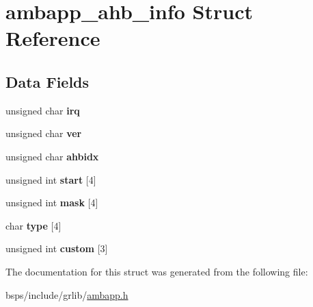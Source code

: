 \hypertarget{structambapp__ahb__info}{}\section{ambapp\+\_\+ahb\+\_\+info Struct Reference}
\label{structambapp__ahb__info}
\subsection*{Data Fields}
\begin{DoxyCompactItemize}
\item 
\mbox{\label{structambapp__ahb__info_abf266deb9afb823e7ff34196570d9f3a}} 
unsigned char {\bfseries irq}
\item 
\mbox{\label{structambapp__ahb__info_ad67939208d2d2c630d3cd3a42517eae7}} 
unsigned char {\bfseries ver}
\item 
\mbox{\label{structambapp__ahb__info_a5165ae0d93924d063e04b126a389d4c9}} 
unsigned char {\bfseries ahbidx}
\item 
\mbox{\label{structambapp__ahb__info_ac352377d1d5965f771eb467077794cd4}} 
unsigned int {\bfseries start} \mbox{[}4\mbox{]}
\item 
\mbox{\label{structambapp__ahb__info_a36b4fb4a620f6156bbba72de622436bb}} 
unsigned int {\bfseries mask} \mbox{[}4\mbox{]}
\item 
\mbox{\label{structambapp__ahb__info_a5085915978cd0f632f8ac1e2f4830442}} 
char {\bfseries type} \mbox{[}4\mbox{]}
\item 
\mbox{\label{structambapp__ahb__info_a2b221f82f5723b985b13bca7c6e20a3d}} 
unsigned int {\bfseries custom} \mbox{[}3\mbox{]}
\end{DoxyCompactItemize}


The documentation for this struct was generated from the following file\+:\begin{DoxyCompactItemize}
\item 
bsps/include/grlib/\mbox{\hyperlink{ambapp_8h}{ambapp.\+h}}\end{DoxyCompactItemize}
